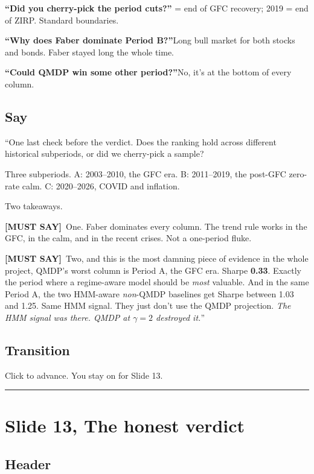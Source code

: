 \documentclass[11pt]{article}
\newcommand{\mustsay}[1]{\textcolor{must}{\textbf{[MUST SAY]}}\ #1}
\begin{document}
\textbf{``Did you cherry-pick the period cuts?''} = end of GFC recovery; 2019 = end of ZIRP. Standard boundaries.

\textbf{``Why does Faber dominate Period B?''}\quad Long bull market for both stocks and bonds. Faber stayed long the whole time.

\textbf{``Could QMDP win some other period?''}\quad No, it's at the bottom of every column.

\subsection*{Say}

``One last check before the verdict. Does the ranking hold across different historical subperiods, or did we cherry-pick a sample?

Three subperiods. A: 2003--2010, the GFC era. B: 2011--2019, the post-GFC zero-rate calm. C: 2020--2026, COVID and inflation.

Two takeaways.

\mustsay{One. Faber dominates every column. The trend rule works in the GFC, in the calm, and in the recent crises. Not a one-period fluke.}

\mustsay{Two, and this is the most damning piece of evidence in the whole project, QMDP's worst column is Period A, the GFC era. Sharpe \textbf{0.33}. Exactly the period where a regime-aware model should be \emph{most} valuable. And in the same Period A, the two HMM-aware \emph{non}-QMDP baselines get Sharpe between 1.03 and 1.25. Same HMM signal. They just don't use the QMDP projection. \emph{The HMM signal was there. QMDP at $\gamma = 2$ destroyed it.}''}

\subsection*{Transition}

Click to advance. You stay on for Slide 13.

\bigskip\hrule

\section*{Slide 13, The honest verdict}

\subsection*{Header}
\end{document}
